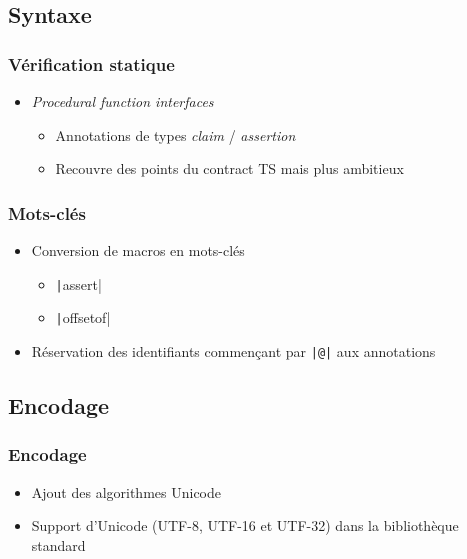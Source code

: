 \documentclass[C++.tex]{subfiles}
\begin{document}
\subsection*{Syntaxe}
\begin{frame}[fragile]
	\frametitle{Vérification statique}
	\begin{itemize}
		\item \textit{Procedural function interfaces}
		\begin{itemize}
			\item Annotations de types \textit{claim} / \textit{assertion}
			\item Recouvre des points du contract TS mais plus ambitieux
		\end{itemize}
	\end{itemize}
\end{frame}

\begin{frame}[fragile]
	\frametitle{Mots-clés}
	\begin{itemize}
		\item Conversion de macros en mots-clés
		\begin{itemize}
			\item \texttt|assert|
			\item \texttt|offsetof|
		\end{itemize}
		\item Réservation des identifiants commençant par \texttt{|@|} aux annotations
	\end{itemize}

\end{frame}

\subsection*{Encodage}
\begin{frame}[fragile]
	\frametitle{Encodage}
	\begin{itemize}
		\item Ajout des algorithmes Unicode


		\item Support d'Unicode (UTF-8, UTF-16 et UTF-32) dans la bibliothèque standard
	\end{itemize}
\end{frame}
\end{document}

